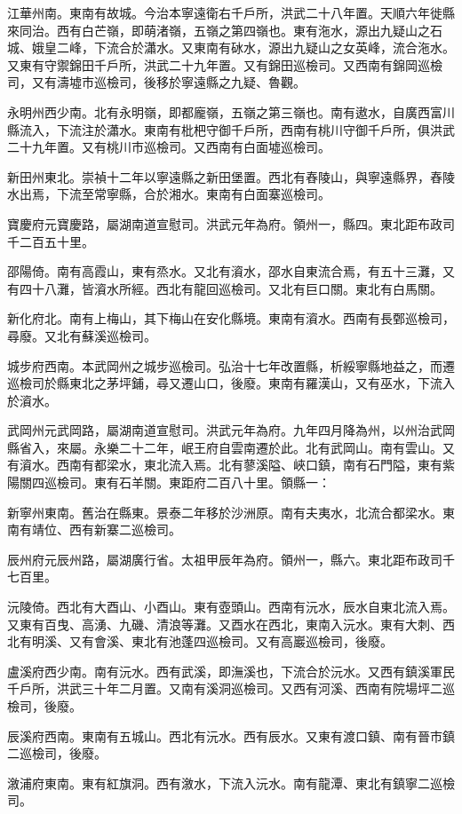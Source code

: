 江華州南。東南有故城。今治本寧遠衛右千戶所，洪武二十八年置。天順六年徙縣來同治。西有白芒嶺，即萌渚嶺，五嶺之第四嶺也。東有沲水，源出九疑山之石城、娥皇二峰，下流合於瀟水。又東南有砅水，源出九疑山之女英峰，流合沲水。又東有守禦錦田千戶所，洪武二十九年置。又有錦田巡檢司。又西南有錦岡巡檢司，又有濤墟市巡檢司，後移於寧遠縣之九疑、魯觀。

永明州西少南。北有永明嶺，即都龐嶺，五嶺之第三嶺也。南有遨水，自廣西富川縣流入，下流注於瀟水。東南有枇杷守御千戶所，西南有桃川守御千戶所，俱洪武二十九年置。又有桃川市巡檢司。又西南有白面墟巡檢司。

新田州東北。崇禎十二年以寧遠縣之新田堡置。西北有舂陵山，與寧遠縣界，舂陵水出焉，下流至常寧縣，合於湘水。東南有白面寨巡檢司。

寶慶府元寶慶路，屬湖南道宣慰司。洪武元年為府。領州一，縣四。東北距布政司千二百五十里。

邵陽倚。南有高霞山，東有烝水。又北有澬水，邵水自東流合焉，有五十三灘，又有四十八灘，皆澬水所經。西北有龍回巡檢司。又北有巨口關。東北有白馬關。

新化府北。南有上梅山，其下梅山在安化縣境。東南有澬水。西南有長鄄巡檢司，尋廢。又北有蘇溪巡檢司。

城步府西南。本武岡州之城步巡檢司。弘治十七年改置縣，析綏寧縣地益之，而遷巡檢司於縣東北之茅坪鋪，尋又遷山口，後廢。東南有羅漢山，又有巫水，下流入於澬水。

武岡州元武岡路，屬湖南道宣慰司。洪武元年為府。九年四月降為州，以州治武岡縣省入，來屬。永樂二十二年，岷王府自雲南遷於此。北有武岡山。南有雲山。又有澬水。西南有都梁水，東北流入焉。北有蓼溪隘、峽口鎮，南有石門隘，東有紫陽關四巡檢司。東有石羊關。東距府二百八十里。領縣一：

新寧州東南。舊治在縣東。景泰二年移於沙洲原。南有夫夷水，北流合都梁水。東南有靖位、西有新寨二巡檢司。

辰州府元辰州路，屬湖廣行省。太祖甲辰年為府。領州一，縣六。東北距布政司千七百里。

沅陵倚。西北有大酉山、小酉山。東有壺頭山。西南有沅水，辰水自東北流入焉。又東有百曳、高湧、九磯、清浪等灘。又酉水在西北，東南入沅水。東有大刺、西北有明溪、又有會溪、東北有池蓬四巡檢司。又有高巖巡檢司，後廢。

盧溪府西少南。南有沅水。西有武溪，即潕溪也，下流合於沅水。又西有鎮溪軍民千戶所，洪武三十年二月置。又南有溪洞巡檢司。又西有河溪、西南有院場坪二巡檢司，後廢。

辰溪府西南。東南有五城山。西北有沅水。西有辰水。又東有渡口鎮、南有晉市鎮二巡檢司，後廢。

漵浦府東南。東有紅旗洞。西有漵水，下流入沅水。南有龍潭、東北有鎮寧二巡檢司。

